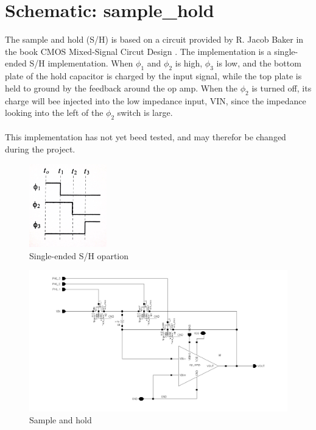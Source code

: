 \documentclass[english, a4paper,11pt]{article}
\begin{document}
\section*{Schematic: sample\_hold}
The sample and hold (S/H) is based on a circuit provided by R. Jacob Baker in the book CMOS Mixed-Signal Circut Design \cite{CMOS-baker}. The implementation is a single-ended S/H implementation. 
When $\phi_{1}$ and $\phi_{2}$ is high, $\phi_{3}$ is low, and the bottom plate of the hold capacitor is charged by the input signal, while the top plate is held to ground by the feedback around the 
op amp. When the $\phi_{2}$ is turned off, its charge will bee injected into the low impedance input, VIN, since the impedance looking into the left of the $\phi_{2}$ switch is large.\\
\\
This implementation has not yet beed tested, and may therefor be changed during the project.\\
\begin{figure}[!ht]
 \centering
   \includegraphics[width=0.3\textwidth]{img/timing_sample_hold.jpg}
   \caption{Single-ended S/H opartion \cite{CMOS-baker}}
   \label{timing}
\end{figure}
\begin{figure}[!ht]
 \centering
   \includegraphics[width=\textwidth]{img/sample_hold}
   \caption{Sample and hold}
   \label{sample:hold}
\end{figure}
\end{document}
